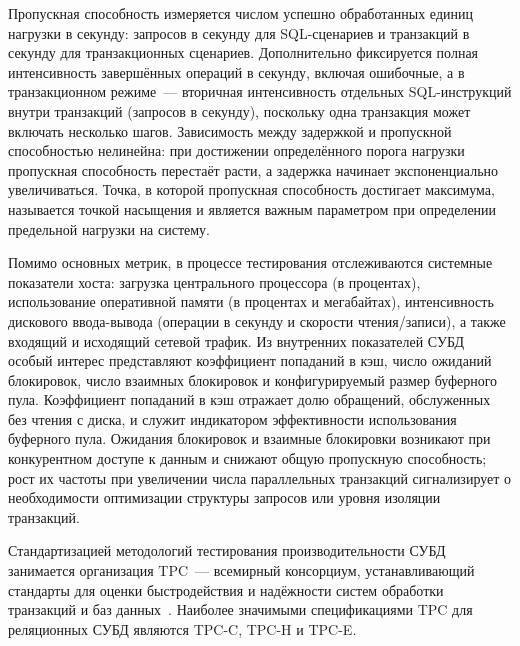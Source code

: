 Пропускная способность измеряется числом успешно обработанных единиц нагрузки в секунду: запросов в секунду для SQL-сценариев и транзакций в секунду для транзакционных сценариев. Дополнительно фиксируется полная интенсивность завершённых операций в секунду, включая ошибочные, а в транзакционном режиме~--- вторичная интенсивность отдельных SQL-инструкций внутри транзакций (запросов в секунду), поскольку одна транзакция может включать несколько шагов. Зависимость между задержкой и пропускной способностью нелинейна: при достижении определённого порога нагрузки пропускная способность перестаёт расти, а задержка начинает экспоненциально увеличиваться. Точка, в которой пропускная способность достигает максимума, называется точкой насыщения и является важным параметром при определении предельной нагрузки на систему.

Помимо основных метрик, в процессе тестирования отслеживаются системные показатели хоста: загрузка центрального процессора (в процентах), использование оперативной памяти (в процентах и мегабайтах), интенсивность дискового ввода-вывода (операции в секунду и скорости чтения/записи), а также входящий и исходящий сетевой трафик. Из внутренних показателей СУБД особый интерес представляют коэффициент попаданий в кэш, число ожиданий блокировок, число взаимных блокировок и конфигурируемый размер буферного пула. Коэффициент попаданий в кэш отражает долю обращений, обслуженных без чтения с диска, и служит индикатором эффективности использования буферного пула. Ожидания блокировок и взаимные блокировки возникают при конкурентном доступе к данным и снижают общую пропускную способность; рост их частоты при увеличении числа параллельных транзакций сигнализирует о необходимости оптимизации структуры запросов или уровня изоляции транзакций.

Стандартизацией методологий тестирования производительности СУБД занимается организация TPC~--- всемирный консорциум, устанавливающий стандарты для оценки быстродействия и надёжности систем обработки транзакций и баз данных~\cite{tpc_specs}. Наиболее значимыми спецификациями TPC для реляционных СУБД являются TPC-C, TPC-H и TPC-E.

